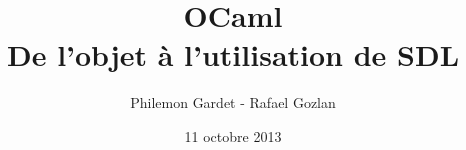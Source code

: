 \documentclass[hideothersubsections]{beamer}
\title{OCaml \\ De l'objet à l'utilisation de SDL}
\author{Philemon Gardet - Rafael Gozlan}
\institute{\texttt{[image: pics/epita.png]}\\\texttt{[image: pics/gconfs.png]}}
\date{11 octobre 2013}
\begin{document}
	\begin{frame}
		\titlepage
	\end{frame}
	
	\begin{frame}
		\tableofcontents
	\end{frame}

	
	
	
	
	
	
	
	
\end{document}
